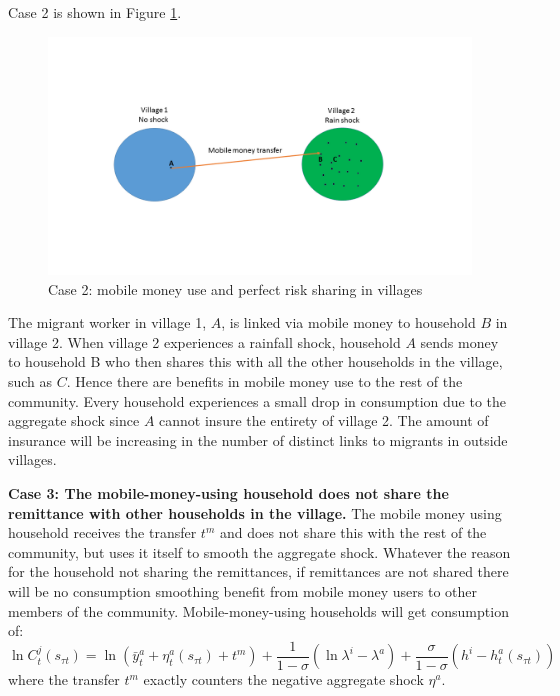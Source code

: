 Case 2 is shown in Figure \ref{fig:link}. 
\begin{figure}[p]
    \centering
\includegraphics[width=17cm,trim=0cm 4cm 0cm 4cm,clip=true, keepaspectratio]{Slide2.PNG} 
\caption{Case 2: mobile money use and perfect risk sharing in villages}
    \label{fig:link}
\end{figure}
The migrant worker in village 1, $A$, is linked via mobile money to household $B$ in village 2. When village 2 experiences a rainfall shock, household $A$ sends money to household B who then shares this with all the other households in the village, such as $C$. Hence there are benefits in mobile money use to the rest of the community. Every household experiences a small drop in consumption due to the aggregate shock since $A$ cannot insure the entirety of village 2. The amount of insurance will be increasing in the number of distinct links to migrants in outside villages. 

\textbf{Case 3: The mobile-money-using household does not share the remittance with other households in the village.}
The mobile money using household receives the transfer $t^m$ and does not share this with the rest of the community,  but uses it itself to smooth the aggregate shock. Whatever the reason for the household not sharing the remittances, if remittances are not shared there will be no consumption smoothing benefit from mobile money users to other members of the community.  Mobile-money-using households will get consumption of:
\begin{equation} \label{eq: MM users}
\ln C_t^j(s_{\tau t}) = \ln (\bar{y}^a_t + \eta_t^a(s_{\tau t}) + t^m) + \frac{1}{1-\sigma}(\ln \lambda^i- \lambda^a) + \frac{\sigma}{1-\sigma}(h^i- h^a_t(s_{\tau t}))
\end{equation}
where the transfer $t^m$ exactly counters the negative aggregate shock $\eta^a$.

